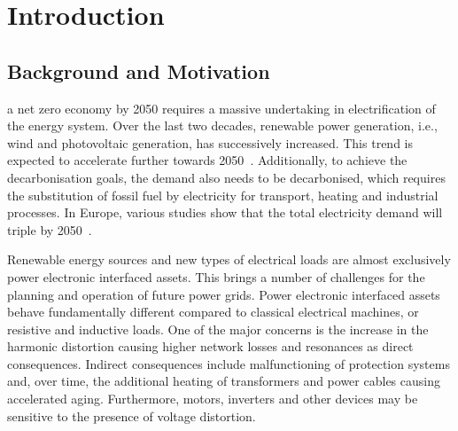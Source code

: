 \section{Introduction}
\label{sec:introduction}

\subsection{Background and Motivation}
\label{sec:background_and_motivation}

 a net zero economy by 2050 requires a massive undertaking in electrification of the energy system. Over the last two decades, renewable power generation, i.e., wind and photovoltaic generation, has successively increased. This trend is expected to accelerate further towards 2050~\cite{international_energy_agency_world_2023}. Additionally, to achieve the decarbonisation goals, the demand also needs to be decarbonised, which requires the substitution of fossil fuel by electricity for transport, heating and industrial processes. In Europe, various studies show that the total electricity demand will triple by 2050~\cite{energyville_paths_2023, elia_belgian_2024}. 

Renewable energy sources and new types of electrical loads are almost exclusively power electronic interfaced assets. This brings a number of challenges for the planning and operation of future power grids. Power electronic interfaced assets behave fundamentally different compared to classical electrical machines, or resistive and inductive loads. One of the major concerns is the increase in the harmonic distortion causing higher network losses and resonances as direct consequences. Indirect consequences include malfunctioning of protection systems and, over time, the additional heating of transformers and power cables causing accelerated aging. Furthermore, motors, inverters and other devices may be sensitive to the presence of voltage distortion.

